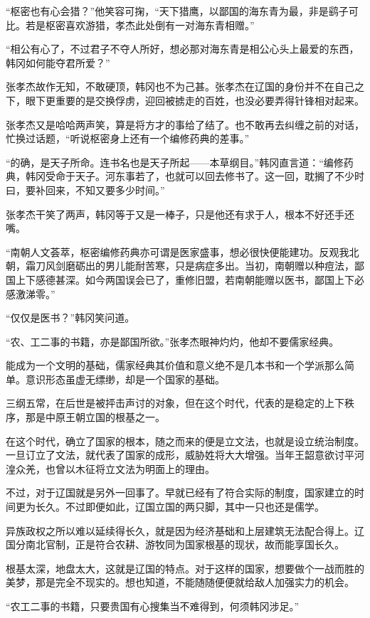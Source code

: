 “枢密也有心会猎？”他笑容可掬，“天下猎鹰，以鄙国的海东青为最，非是鹞子可比。若是枢密喜欢游猎，孝杰此处倒有一对海东青相赠。”

“相公有心了，不过君子不夺人所好，想必那对海东青是相公心头上最爱的东西，韩冈如何能夺君所爱？”

张孝杰故作无知，不敢硬顶，韩冈也不为己甚。张孝杰在辽国的身份并不在自己之下，眼下更重要的是交换俘虏，迎回被掳走的百姓，也没必要弄得针锋相对起来。

张孝杰又是哈哈两声笑，算是将方才的事给了结了。也不敢再去纠缠之前的对话，忙换过话题，“听说枢密身上还有一个编修药典的差事。”

“的确，是天子所命。连书名也是天子所起——本草纲目。”韩冈直言道：“编修药典，韩冈受命于天子。河东事若了，也就可以回去修书了。这一回，耽搁了不少时曰，要补回来，不知又要多少时间。”

张孝杰干笑了两声，韩冈等于又是一棒子，只是他还有求于人，根本不好还手还嘴。

“南朝人文荟萃，枢密编修药典亦可谓是医家盛事，想必很快便能建功。反观我北朝，霜刀风剑磨砺出的男儿能耐苦寒，只是病症多出。当初，南朝赠以种痘法，鄙国上下感德甚深。如今两国误会已了，重修旧盟，若南朝能赠以医书，鄙国上下必感激涕零。”

“仅仅是医书？”韩冈笑问道。

“农、工二事的书籍，亦是鄙国所欲。”张孝杰眼神灼灼，他却不要儒家经典。

能成为一个文明的基础，儒家经典其价值和意义绝不是几本书和一个学派那么简单。意识形态虽虚无缥缈，却是一个国家的基础。

三纲五常，在后世是被抨击声讨的对象，但在这个时代，代表的是稳定的上下秩序，那是中原王朝立国的根基之一。

在这个时代，确立了国家的根本，随之而来的便是立文法，也就是设立统治制度。一旦订立了文法，就代表了国家的成形，威胁姓将大大增强。当年王韶意欲讨平河湟众羌，也曾以木征将立文法为明面上的理由。

不过，对于辽国就是另外一回事了。早就已经有了符合实际的制度，国家建立的时间更为长久。不过即便如此，辽国立国的两只脚，其中一只也还是儒学。

异族政权之所以难以延续得长久，就是因为经济基础和上层建筑无法配合得上。辽国分南北官制，正是符合农耕、游牧同为国家根基的现状，故而能享国长久。

根基太深，地盘太大，这就是辽国的特点。对于这样的国家，想要做个一战而胜的美梦，那是完全不现实的。想也知道，不能随随便便就给敌人加强实力的机会。

“农工二事的书籍，只要贵国有心搜集当不难得到，何须韩冈涉足。”

